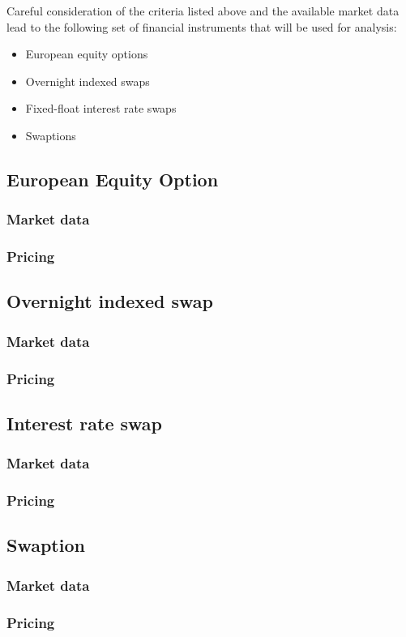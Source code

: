 \documentclass[../Thesis_AHoecherl.tex]{subfiles}
\begin{document}
    Careful consideration of the criteria listed above and the available market data lead to the following set of financial instruments that will be used for analysis:

    \begin{itemize}
        \item European equity options
        \item Overnight indexed swaps
        \item Fixed-float interest rate swaps
        \item Swaptions
    \end{itemize}

    \subsection{European Equity Option}

    

    \subsubsection{Market data}
    \subsubsection{Pricing}
    \subsection{Overnight indexed swap}
    \subsubsection{Market data}
    \subsubsection{Pricing}
    \subsection{Interest rate swap}
    \subsubsection{Market data}
    \subsubsection{Pricing} 
    \subsection{Swaption}
    \subsubsection{Market data}
    \subsubsection{Pricing}
\end{document}
